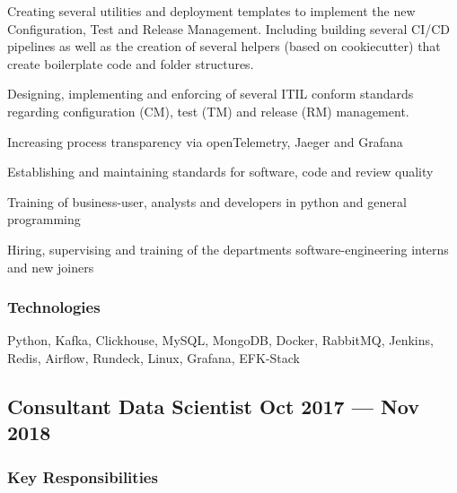 \documentclass[letter,10pt]{article}
\begin{document}
\begin{zitemize}
	\item Creating several utilities and deployment templates to implement the new Configuration, Test and Release Management. Including building several CI/CD pipelines as well as the creation of several helpers (based on cookiecutter) that create boilerplate code and folder structures. 
	
	\item Designing, implementing and enforcing of several ITIL conform standards regarding configuration (CM), test (TM) and release (RM) management.
	
	
	\item Increasing process transparency via openTelemetry, Jaeger and Grafana 
	
	\item Establishing and maintaining standards for software, code and review quality 
	
	
		
	\item Training of business-user, analysts and developers in python and general programming
	
	\item Hiring, supervising  and  training  of  the  departments  software-engineering interns and new joiners
\end{zitemize}

\subsubsection*{{Technologies}}

Python, Kafka, Clickhouse, MySQL, MongoDB, Docker, RabbitMQ, Jenkins, Redis, Airflow, Rundeck, Linux, Grafana, EFK-Stack \vspace{1em}


\subsection{{Consultant Data Scientist \hfill Oct 2017 --- Nov 2018}}


\subsubsection*{{Key Responsibilities}}
\end{document}
